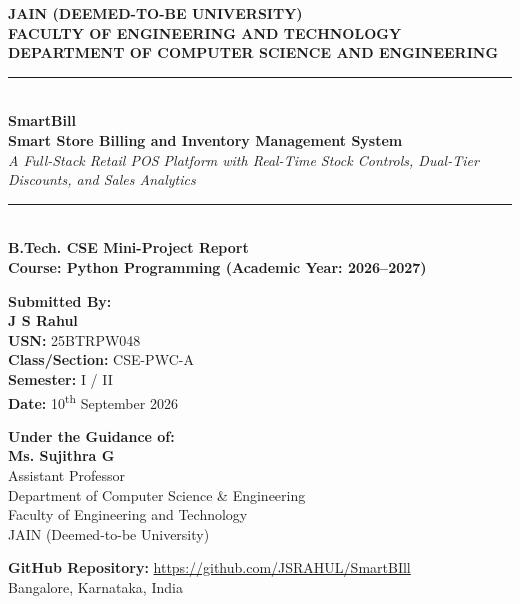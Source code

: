 \documentclass[12pt,a4paper]{article}
\begin{document}
\begin{titlepage}
    \centering
    \vspace*{0.5cm}
    
    {\Large\textbf{JAIN (DEEMED-TO-BE UNIVERSITY)}}\\[0.2cm]
    {\large\textbf{FACULTY OF ENGINEERING AND TECHNOLOGY}}\\[0.15cm]
    {\normalsize\textbf{DEPARTMENT OF COMPUTER SCIENCE AND ENGINEERING}}\\[0.8cm]
    
    \rule{\linewidth}{1.2pt}\\[0.4cm]
    {\huge\textbf{\textcolor{accent}{SmartBill}}}\\[0.25cm]
    {\Large\textbf{Smart Store Billing and Inventory Management System}}\\[0.2cm]
    {\normalsize\textit{A Full-Stack Retail POS Platform with Real-Time Stock Controls, Dual-Tier Discounts, and Sales Analytics}}\\[0.3cm]
    \rule{\linewidth}{1.2pt}\\[1.2cm]
    
    \textbf{\large B.Tech. CSE Mini-Project Report}\\[0.2cm]
    \textbf{\normalsize Course: Python Programming (Academic Year: 2026--2027)}\\[1.5cm]
    
    \begin{minipage}{0.48\textwidth}
        \flushleft
        \textbf{\textcolor{primary}{Submitted By:}}\\[0.2cm]
        \textbf{J S Rahul}\\[0.1cm]
        \textbf{USN:} 25BTRPW048\\[0.1cm]
        \textbf{Class/Section:} CSE-PWC-A\\[0.1cm]
        \textbf{Semester:} I / II\\[0.1cm]
        \textbf{Date:} 10\textsuperscript{th} September 2026
    \end{minipage}
    \hfill
    \begin{minipage}{0.48\textwidth}
        \flushright
        \textbf{\textcolor{primary}{Under the Guidance of:}}\\[0.2cm]
        \textbf{Ms. Sujithra G}\\[0.1cm]
        Assistant Professor\\[0.1cm]
        Department of Computer Science \& Engineering\\[0.1cm]
        Faculty of Engineering and Technology\\[0.1cm]
        JAIN (Deemed-to-be University)
    \end{minipage}
    
    \vfill
    {\small\textbf{GitHub Repository:} \href{https://github.com/JSRAHUL/SmartBIll}{https://github.com/JSRAHUL/SmartBIll}}\\[0.2cm]
    {\small Bangalore, Karnataka, India}
\end{titlepage}
\end{document}
